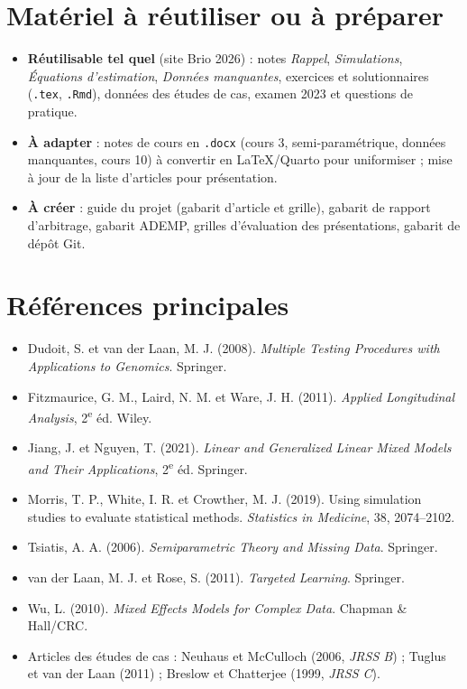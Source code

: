 \documentclass[11pt]{article}
\begin{document}
\section{Matériel à réutiliser ou à préparer}

\begin{itemize}
  \item \textbf{Réutilisable tel quel} (site Brio 2026) : notes \emph{Rappel}, \emph{Simulations},
        \emph{Équations d'estimation}, \emph{Données manquantes}, exercices et solutionnaires
        (\texttt{.tex}, \texttt{.Rmd}), données des études de cas, examen 2023 et questions de pratique.
  \item \textbf{À adapter} : notes de cours en \texttt{.docx} (cours 3, semi-paramétrique,
        données manquantes, cours 10) à convertir en LaTeX/Quarto pour uniformiser ;
        mise à jour de la liste d'articles pour présentation.
  \item \textbf{À créer} : guide du projet (gabarit d'article et grille), gabarit de rapport
        d'arbitrage, gabarit ADEMP, grilles d'évaluation des présentations, gabarit de dépôt Git.
\end{itemize}

\section*{Références principales}
\begin{itemize}[leftmargin=*,label={}]\small
  \item Dudoit, S. et van der Laan, M. J. (2008). \emph{Multiple Testing Procedures with Applications to Genomics}. Springer.
  \item Fitzmaurice, G. M., Laird, N. M. et Ware, J. H. (2011). \emph{Applied Longitudinal Analysis}, 2\textsuperscript{e} éd. Wiley.
  \item Jiang, J. et Nguyen, T. (2021). \emph{Linear and Generalized Linear Mixed Models and Their Applications}, 2\textsuperscript{e} éd. Springer.
  \item Morris, T. P., White, I. R. et Crowther, M. J. (2019). Using simulation studies to evaluate statistical methods. \emph{Statistics in Medicine}, 38, 2074--2102.
  \item Tsiatis, A. A. (2006). \emph{Semiparametric Theory and Missing Data}. Springer.
  \item van der Laan, M. J. et Rose, S. (2011). \emph{Targeted Learning}. Springer.
  \item Wu, L. (2010). \emph{Mixed Effects Models for Complex Data}. Chapman \& Hall/CRC.
  \item Articles des études de cas : Neuhaus et McCulloch (2006, \emph{JRSS B}) ; Tuglus et van der Laan (2011) ; Breslow et Chatterjee (1999, \emph{JRSS C}).
\end{itemize}
\end{document}
